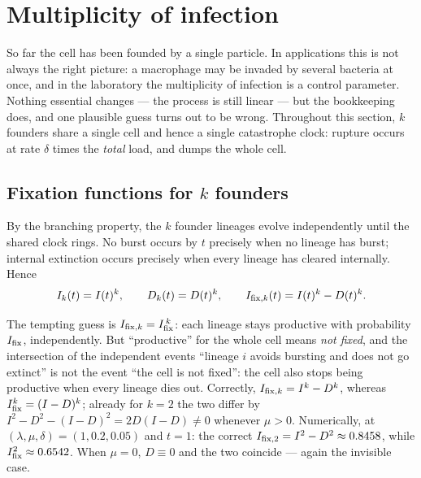 
\section{Multiplicity of infection}
\label{sec:moi}

So far the cell has been founded by a single particle. In applications this
is not always the right picture: a macrophage may be invaded by several
bacteria at once, and in the laboratory the multiplicity of infection is a
control parameter. Nothing essential changes --- the process is still linear
--- but the bookkeeping does, and one plausible guess turns out to be wrong.
Throughout this section, $k$ founders share a single cell and hence a single
catastrophe clock: rupture occurs at rate $\delta$ times the \emph{total}
load, and dumps the whole cell.

\subsection{Fixation functions for $k$ founders}

By the branching property, the $k$ founder lineages evolve independently
until the shared clock rings. No burst occurs by $t$ precisely when no
lineage has burst; internal extinction occurs precisely when every lineage
has cleared internally. Hence
\begin{equation}
I_k(t)=I(t)^k,\qquad
D_k(t)=D(t)^k,\qquad
\Ifix[,{k}](t)=I(t)^k-D(t)^k.
\label{eq:Ihatk}
\end{equation}

\begin{remark}
\label{rem:ihatk}
The tempting guess is $\Ifix[,{k}]=\Ifix^{\,k}$: each lineage stays productive
with probability $\Ifix$, independently. But ``productive'' for the whole
cell means \emph{not fixed}, and the intersection of the independent events
``lineage $i$ avoids bursting and does not go extinct'' is not the event
``the cell is not fixed'': the cell also stops being productive when every
lineage dies out. Correctly, $\Ifix[,{k}]=I^k-D^k$, whereas
$\Ifix^k=(I-D)^k$; already for $k=2$ the two differ by
$I^2-D^2-(I-D)^2=2D(I-D)\neq0$ whenever $\mu>0$. Numerically, at
$(\lambda,\mu,\delta)=(1,0.2,0.05)$ and $t=1$: the correct
$\Ifix[,{2}]=I^2-D^2\approx0.8458$, while $\Ifix^2\approx0.6542$. When $\mu=0$,
$D\equiv0$ and the two coincide --- again the invisible case.
\end{remark}

